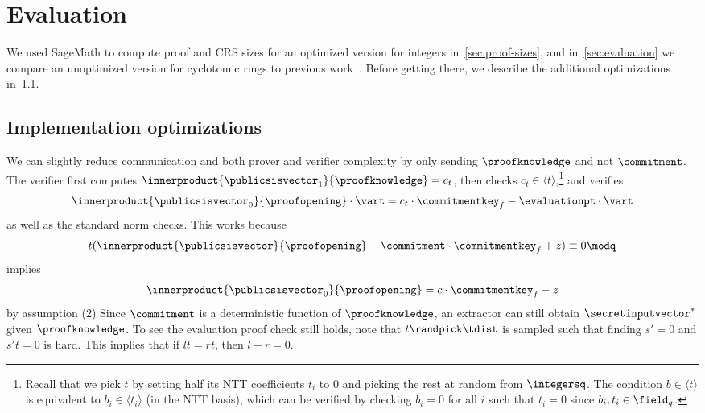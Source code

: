 \section{Evaluation}

We used SageMath to compute proof and CRS sizes for an optimized version \sys for integers in~\cref{sec:proof-sizes}, and in~\cref{sec:evaluation} we compare an unoptimized version for cyclotomic rings to previous work~\cite{C:ACLMT22}. Before getting there, we describe the additional optimizations in~\cref{sec:optimization}.

\subsection{Implementation optimizations}
\label{sec:optimization}

We can slightly reduce communication and both prover and verifier complexity by only sending $\proofknowledge$ and not $\commitment$. The verifier first computes $\innerproduct{\publicsisvector_1}{\proofknowledge} = c_t$, then checks $c_t \in \langle t \rangle$,\footnote{Recall that we pick $t$ by setting half its NTT coefficients $t_i$ to $0$ and picking the rest at random from $\integersq$. The condition $b \in \langle t \rangle$ is equivalent to $b_i \in \langle t_i \rangle$ (in the NTT basis), which can be verified by checking $b_i = 0$ for all $i$ such that $t_i = 0$ since $b_i,t_i \in \field_q$.} and verifies
\[
\innerproduct{\publicsisvector_0}{\proofopening}\cdot\vart = c_t \cdot\commitmentkey_f - \evaluationpt\cdot\vart
\]
as well as the standard norm checks. This works because
\[
  t(\innerproduct{\publicsisvector}{\proofopening} - \commitment \cdot \commitmentkey_f + z) \equiv 0 \modq
\]
implies
\[
\innerproduct{\publicsisvector_0}{\proofopening} = c \cdot\commitmentkey_f - z 
\]
by assumption (2)
Since $\commitment$ is a deterministic function of $\proofknowledge$, an extractor can still obtain $\secretinputvector^*$ given $\proofknowledge$.
To see the evaluation proof check still holds,
note that $t \randpick \tdist$ is sampled such that finding $s' = 0$ and $s't = 0$ is hard.
This implies that if $lt = rt$,
then $l - r = 0$.


